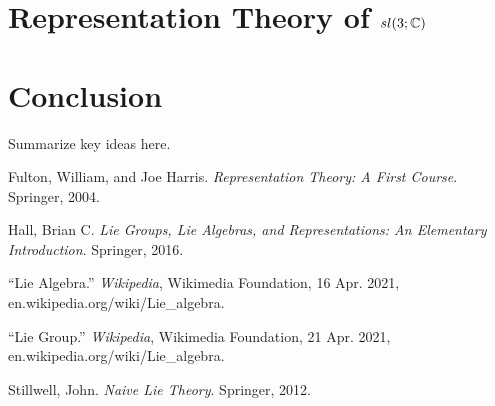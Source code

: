 \documentclass[11pt, a4paper, oneside]{article}
\theoremstyle{plain}
\theoremstyle{definition}
\theoremstyle{example}
\begin{document}
\section{Representation Theory of $sl(3; \mathbb{C})$}


\newpage
\section{Conclusion}

Summarize key ideas here.

\newpage
\begin{thebibliography}{9}

Fulton, William, and Joe Harris. \textit{Representation Theory: A First Course}. Springer, 2004. 

Hall, Brian C. \textit{Lie Groups, Lie Algebras, and Representations: An Elementary Introduction}. Springer, 2016.  

“Lie Algebra.” \textit{Wikipedia}, Wikimedia Foundation, 16 Apr. 2021, \\ en.wikipedia.org/wiki/Lie\_algebra. 

“Lie Group.” \textit{Wikipedia}, Wikimedia Foundation, 21 Apr. 2021, \\ en.wikipedia.org/wiki/Lie\_algebra. 

Stillwell, John. \textit{Naive Lie Theory}. Springer, 2012. 

\end{thebibliography}
\end{document}
